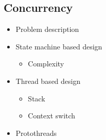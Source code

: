 \subsection{Concurrency}
\begin{itemize}
\item Problem description
\item State machine based design
\begin{itemize}
\item Complexity
\end{itemize}
\item Thread based design
\begin{itemize}
\item Stack
\item Context switch
\end{itemize}
\item Protothreads
\end{itemize}
